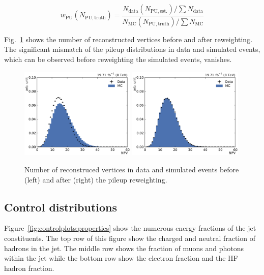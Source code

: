 \begin{equation*}
    w_{\mathrm{PU}} (N_{\mathrm{PU, truth}}) = \frac{N_\mathrm{data}
    (N_\mathrm{PU, est.}) / \sum N_\mathrm{data}}{N_\mathrm{MC}
    (N_\mathrm{PU, truth}) / \sum N_\mathrm{MC}}
\end{equation*}

Fig.~\ref{fig:mc:npv_reweighting} shows the number of reconstructed vertices
before and after reweighting. The significant mismatch of the
pileup distributions in data and simulated events, which can be observed before
reweighting the simulated events, vanishes.

\begin{figure}[htbp]
    \centering
    \includegraphics[width=0.49\textwidth]{figures/measurement/npv_beforereweighting.pdf}\hfill
    \includegraphics[width=0.49\textwidth]{figures/measurement/npv_afterreweighting.pdf}
    \caption[Number of reconstructed vertices]{Number of reconstruced vertices in data and simulated events before
    (left) and after (right) the pileup reweighting.}
    \label{fig:mc:npv_reweighting}
\end{figure}

\subsection{Control distributions}

Figure~\ref{fig:controlplots:properties} show the numerous energy fractions of the jet constituents. The top
row of this figure show the charged and neutral fraction of hadrons in the jet. The middle row shows
the fraction of muons and photons within the jet while the bottom row show the electron fraction and
the HF hadron fraction.



